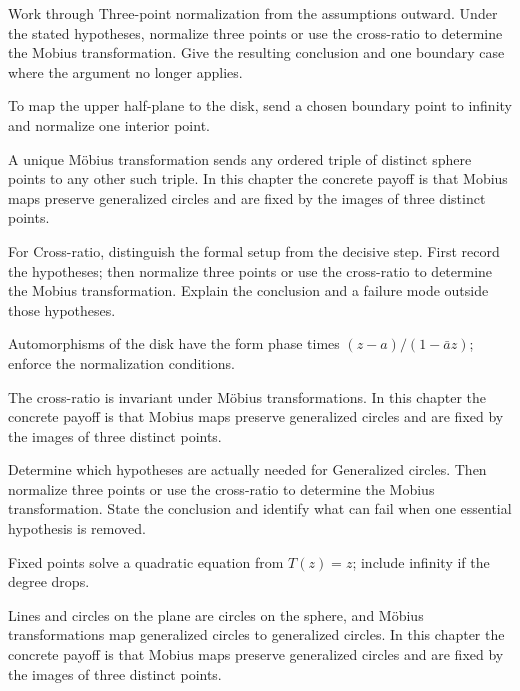\begin{exercise}\label{exr:iv16-04}
Work through Three-point normalization from the assumptions outward. Under the stated hypotheses, normalize three points or use the cross-ratio to determine the Mobius transformation. Give the resulting conclusion and one boundary case where the argument no longer applies.
\end{exercise}
\begin{hint}
To map the upper half-plane to the disk, send a chosen boundary point to infinity and normalize one interior point.
\end{hint}
\begin{solution}
A unique Möbius transformation sends any ordered triple of distinct sphere points to any other such triple. In this chapter the concrete payoff is that Mobius maps preserve generalized circles and are fixed by the images of three distinct points.
\end{solution}

\begin{exercise}\label{exr:iv16-05}
For Cross-ratio, distinguish the formal setup from the decisive step. First record the hypotheses; then normalize three points or use the cross-ratio to determine the Mobius transformation. Explain the conclusion and a failure mode outside those hypotheses.
\end{exercise}
\begin{hint}
Automorphisms of the disk have the form phase times \((z-a)/(1-\bar a z)\); enforce the normalization conditions.
\end{hint}
\begin{solution}
The cross-ratio is invariant under Möbius transformations. In this chapter the concrete payoff is that Mobius maps preserve generalized circles and are fixed by the images of three distinct points.
\end{solution}

\begin{exercise}\label{exr:iv16-06}
Determine which hypotheses are actually needed for Generalized circles. Then normalize three points or use the cross-ratio to determine the Mobius transformation. State the conclusion and identify what can fail when one essential hypothesis is removed.
\end{exercise}
\begin{hint}
Fixed points solve a quadratic equation from \(T(z)=z\); include infinity if the degree drops.
\end{hint}
\begin{solution}
Lines and circles on the plane are circles on the sphere, and Möbius transformations map generalized circles to generalized circles. In this chapter the concrete payoff is that Mobius maps preserve generalized circles and are fixed by the images of three distinct points.
\end{solution}


